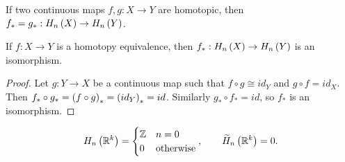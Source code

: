 \begin{theorem}
\label{thm:2.10}
If two continuous maps $ f, g : X \to Y $ are homotopic, then $ f_* = g_* : H_n\left( X \right) \to H_n\left( Y \right) $.
\end{theorem}

\begin{corollary}
If $ f : X \to Y $ is a homotopy equivalence, then $ f_* : H_n\left( X \right) \to H_n\left( Y \right) $ is an isomorphism.
\end{corollary}

\begin{proof}
Let $ g : Y \to X $ be a continuous map such that $ f \circ g \cong id_Y $ and $ g \circ f = id_X $. Then $ f_* \circ g_* = \left( f \circ g \right)_* = \left( id_Y \right)_* = id $. Similarly $ g_* \circ f_* = id $, so $ f_* $ is an isomorphism.
\end{proof}

\begin{example*}
$$ H_n\left( \mathbb{R}^k \right) =
\begin{cases}
\mathbb{Z} & n = 0 \\
0 & \text{otherwise}
\end{cases},
\qquad \widetilde{H}_n\left( \mathbb{R}^k \right) = 0.
$$
\end{example*}

